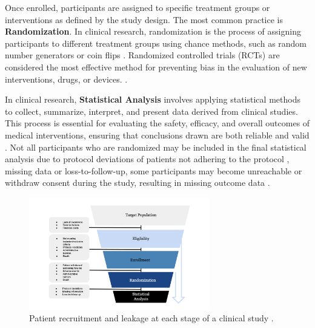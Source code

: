 Once enrolled, participants are assigned to specific treatment groups or interventions as defined by the study design. The most common practice is \textbf{Randomization}. In clinical research, randomization is the process of assigning participants to different treatment groups using chance methods, such as random number generators or coin flips \citep{lim2019randomization}. Randomized controlled trials (RCTs) are considered the most effective method for preventing bias in the evaluation of new interventions, drugs, or devices. \citep{van2007eligibility}.


In clinical research, \textbf{Statistical Analysis} involves applying statistical methods to collect, summarize, interpret, and present data derived from clinical studies. This process is essential for evaluating the safety, efficacy, and overall outcomes of medical interventions, ensuring that conclusions drawn are both reliable and valid \citep{panos2023statistical}. Not all participants who are randomized may be included in the final statistical analysis due to protocol deviations of patients not adhering to the protocol \citep{rehman2020exclusion}, missing data \citep{shih2002problems} or loss-to-follow-up, some participants may become unreachable or withdraw consent during the study, resulting in missing outcome data \citep{nuesch2009effects}.

\begin{figure}[h]
  \centering
  \includegraphics[width=0.7\textwidth]{fig_2_1_a.png}
  \caption{Patient recruitment and leakage at each stage of a clinical study \citep{piantadosi2022principles, whelan2018high, bogin2022lasagna}.}
  \label{fig:2_1_a}
\end{figure}

